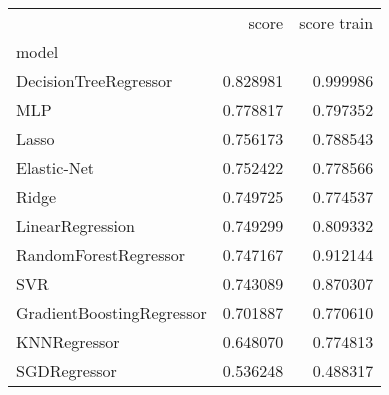 \begin{tabular}{lrr}
\toprule
{} &     score &  score train \\
model                     &           &              \\
\midrule
DecisionTreeRegressor     &  0.828981 &     0.999986 \\
MLP                       &  0.778817 &     0.797352 \\
Lasso                     &  0.756173 &     0.788543 \\
Elastic-Net               &  0.752422 &     0.778566 \\
Ridge                     &  0.749725 &     0.774537 \\
LinearRegression          &  0.749299 &     0.809332 \\
RandomForestRegressor     &  0.747167 &     0.912144 \\
SVR                       &  0.743089 &     0.870307 \\
GradientBoostingRegressor &  0.701887 &     0.770610 \\
KNNRegressor              &  0.648070 &     0.774813 \\
SGDRegressor              &  0.536248 &     0.488317 \\
\bottomrule
\end{tabular}

